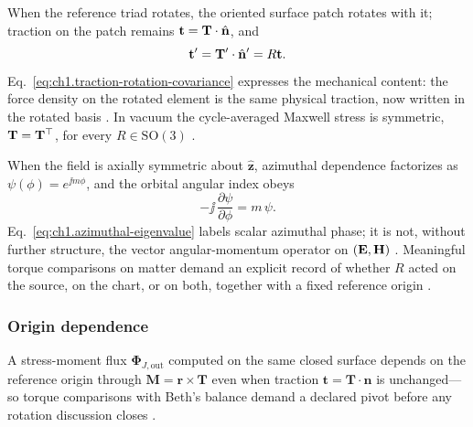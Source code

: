 When the reference triad rotates, the oriented surface patch rotates with it; traction on the patch remains $\mathbf{t}=\mathbf{T}\cdot\hat{\mathbf{n}}$, and
\begin{equation}
\label{eq:ch1.traction-rotation-covariance}
\mathbf{t}'=\mathbf{T}'\cdot\hat{\mathbf{n}}' = R\mathbf{t}.
\end{equation}
Eq.~\eqref{eq:ch1.traction-rotation-covariance} expresses the mechanical content: the force density on the rotated element is the same physical traction, now written in the rotated basis \cite{beth1936}. In vacuum the cycle-averaged Maxwell stress is symmetric, $\mathbf{T}=\mathbf{T}^\top$, for every $R\in\mathrm{SO}(3)$ \cite{maxwell1873}.

When the field is axially symmetric about \(\hat{\mathbf{z}}\), azimuthal dependence factorizes as \(\psi(\phi)=e^{\jj m\phi}\), and the orbital angular index obeys
\begin{equation}
\label{eq:ch1.azimuthal-eigenvalue}
-\jj\,\frac{\partial\psi}{\partial\phi}=m\,\psi.
\end{equation}
Eq.~\eqref{eq:ch1.azimuthal-eigenvalue} labels scalar azimuthal phase; it is not, without further structure, the vector angular-momentum operator on $(\mathbf{E},\mathbf{H})$ \cite{stratton1941}. Meaningful torque comparisons on matter demand an explicit record of whether $R$ acted on the source, on the chart, or on both, together with a fixed reference origin \cite{beth1936,stratton1941}.

\label{eq:ch1.active-passive-duality}
\label{eq:ch1.tensor-invariant-trace}
\label{eq:ch1.stress-eigen-covariance}
\label{eq:ch1.rotation-group-action}
\label{eq:ch1.dyadic-covariance}
\label{eq:ch1.rank1-dyad-rotation}
\label{sec:ch01.3.2b}
\label{eq:ch1.total-angular-generator}
\label{eq:ch1.orbital-angular-generator}
\label{eq:ch1.spin-angular-generator}
\label{eq:ch1.rotation-from-generators}

\label{sec:ch01.3.3}
\subsubsection*{Origin dependence}

A stress-moment flux $\boldsymbol{\Phi}_{J,\mathrm{out}}$ computed on the same closed surface depends on the reference origin through $\mathbf{M}=\mathbf{r}\times\mathbf{T}$ even when traction $\mathbf{t}=\mathbf{T}\cdot\hat{\mathbf{n}}$ is unchanged---so torque comparisons with Beth's balance demand a declared pivot before any rotation discussion closes \cite{beth1936,stratton1941}.

